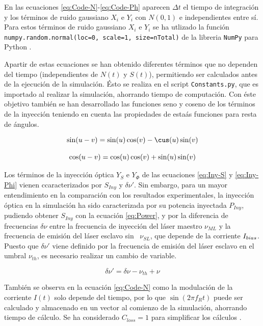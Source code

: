 En las ecuaciones \ref{eq:Code-N}-\ref{eq:Code-Ph} aparecen $\Delta t$ el tiempo de integraci\'on y los t\'erminos de ruido gaussiano $X_i$ e $Y_i$ con $N(0, 1)$ e independientes entre s\'i. Para estos t\'erminos de ruido gaussiano $X_i$ e $Y_i$ se ha utlizado la funci\'on \texttt{numpy.random.normal(loc=0, scale=1, size=nTotal)} de la libreria \texttt{NumPy} para Python \cite{numpy}.

Apartir de estas ecuaciones se han obtenido diferentes t\'erminos que no dependen del tiempo (independientes de $N(t)$ y $S(t)$), permitiendo ser calculados antes de la ejecuci\'on de la simulaci\'on. \'Esto se realiza en el script \texttt{Constants.py}, que es importado al realizar la simulaci\'on, ahorrando tiempo de computaci\'on. Con \'este objetivo tambi\'en se han desarrollado las funciones seno y coseno de los t\'erminos de la inyecci\'on teniendo en cuenta las propiedades de esta\'as funciones para resta de \'angulos.

	\begin{equation}
		\begin{matrix}
			\sin(u - v) = \sin(u)\cos(v) - \cus(u)\sin(v) \\ \\

			\cos(u - v) = \cos(u)\cos(v) + \sin(u)\sin(v) 
		\end{matrix}
	\end{equation}

	Los t\'erminos de la inyecci\'on \'optica $Y_S$ e $Y_{\Phi}$ de las ecuaciones \ref{eq:Iny-S} y \ref{eq:Iny-Phi} vienen ccaracterizados por $S_{Iny}$ y $\delta\nu'$. Sin embargo, para un mayor entendimiento en la comparaci\'on con los resultados experimentales, la inyecci\'on \'optica en la simulaci\'on ha sido caracterizada por su potencia inyectada $P_{Iny}$, pudiendo obtener $S_{Iny}$ con la ecuaci\'on \ref{eq:Power}, y por la diferencia de frecuencias $\delta\nu$ entre la frecuencia de inyecci\'on del l\'aser maestro $\nu_{ML}$ y la frecuencia de emisi\'on del l\'aser esclavo sin \gs\ $\nu_{SL}$, que depende de la corriente $I_{bias}$. Puesto que $\delta\nu'$ viene definido por la frecuencia de emisi\'on del l\'aser esclavo en el umbral $\nu_{th}$, es necesario realizar un cambio de variable.

	\begin{equation}
		\delta\nu' = \delta\nu - \nu_{th} + \nu
	\end{equation}

	Tambi\'en se observa en la ecuaci\'on \ref{eq:Code-N} como la modulaci\'on de la corriente $I(t)$ solo depende del tiempo, por lo que $\sin(2\pi f_R t)$ puede ser calculado y almacenado en un vector al comienzo de la simulaci\'on, ahorrando tiempo de c\'alculo. Se ha considerado $C_{loss} = 1$ para simplificar los c\'alculos \cite{Chaves19}.

